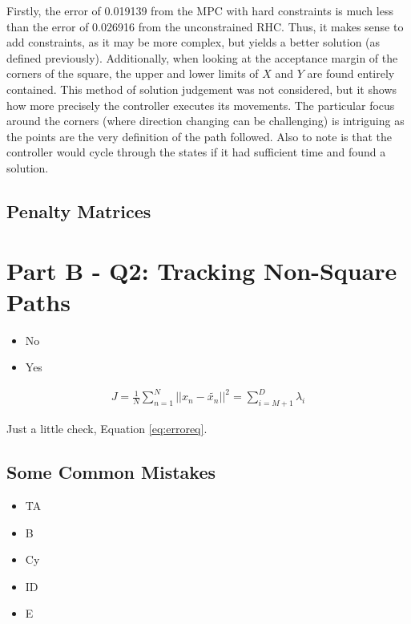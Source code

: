 \documentclass[letterpaper, 10 pt, conference]{ieeeconf} %
\begin{document}
Firstly, the error of 0.019139 from the MPC with hard constraints is much less than the error of 0.026916 from the unconstrained RHC. Thus, it makes sense to add constraints, as it may be more complex, but yields a better solution (as defined previously). Additionally, when looking at the acceptance margin of the corners of the square, the upper and lower limits of $X$ and $Y$ are found entirely contained. This method of solution judgement was not considered, but it shows how more precisely the controller executes its movements. The particular focus around the corners (where direction changing can be challenging) is intriguing as the points are the very definition of the path followed. Also to note is that the controller would cycle through the states if it had sufficient time and found a solution.

\subsection{Penalty Matrices}


\section{Part B - Q2: Tracking Non-Square Paths}


\begin{itemize}
    \item No
    \item Yes
\end{itemize}

\begin{align}
    J = \frac{1}{N} \sum_{n=1}^{N} \lvert \lvert x_n - \widetilde{x_n} \rvert \rvert ^2 = \sum_{i = M+1}^{D} \lambda_i \label{eq:erroreq}
\end{align}

Just a little check, Equation \ref{eq:erroreq}.

\subsection{Some Common Mistakes}
\begin{itemize}

    \item TA
    \item B
    \item Cy
    \item ID
    \item E
\end{itemize}
\end{document}
